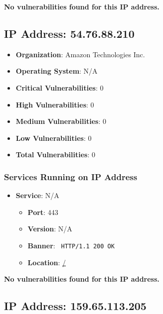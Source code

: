 \documentclass{article}
\begin{document}
\textbf{No vulnerabilities found for this IP address.}


\clearpage



\subsection*{IP Address: 54.76.88.210}

\begin{itemize}
    \item \textbf{Organization}: Amazon Technologies Inc.
    \item \textbf{Operating System}:  N/A 
    \item \textbf{Critical Vulnerabilities}: 0
    \item \textbf{High Vulnerabilities}: 0
    \item \textbf{Medium Vulnerabilities}: 0
    \item \textbf{Low Vulnerabilities}: 0
    \item \textbf{Total Vulnerabilities}: 0
\end{itemize}

\subsubsection*{Services Running on IP Address}

\begin{itemize}
    
        \item \textbf{Service}: N/A
        \begin{itemize}
            \item \textbf{Port}: 443
            \item \textbf{Version}:  N/A 
            \item \textbf{Banner}: \texttt{ HTTP/1.1 200 OK
 }
            \item \textbf{Location}: \href{ / }{ / }
        \end{itemize}
    
\end{itemize}


\textbf{No vulnerabilities found for this IP address.}


\clearpage



\subsection*{IP Address: 159.65.113.205}
\end{document}
